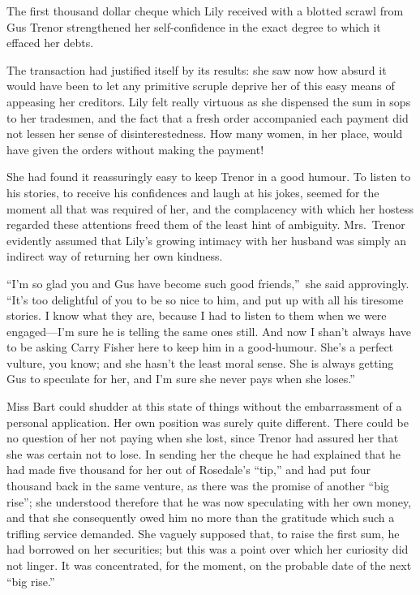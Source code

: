 \documentclass[12pt,a4paper]{book}
\begin{document}
The first thousand dollar cheque which Lily received with a
blotted scrawl from Gus Trenor strengthened her self-confidence
in the exact degree to which it effaced her debts.





The transaction had justified itself by its results: she saw now
how absurd it would have been to let any primitive scruple
deprive her of this easy means of appeasing her creditors. Lily
felt really virtuous as she dispensed the sum in sops to her
tradesmen, and the fact that a fresh order accompanied each
payment did not lessen her sense of disinterestedness. How many
women, in her place, would have given the orders without making
the payment!





She had found it reassuringly easy to keep Trenor in a good
humour. To listen to his stories, to receive his confidences and
laugh at his jokes, seemed for the moment all that was required
of her, and the complacency with which her hostess regarded these
attentions freed them of the least hint of ambiguity. Mrs.\ Trenor
evidently assumed that Lily's growing intimacy with her husband
was simply an indirect way of returning her own kindness.





``I'm so glad you and Gus have become such good friends,''\ she said
approvingly. ``It's too delightful of you to be so nice to him,
and put up with all his tiresome stories. I know what they are,
because I had to listen to them when we were engaged---I'm sure he
is telling the same ones still. And now I shan't always have to
be asking Carry Fisher here to keep him in a good-humour. She's a
perfect vulture, you know; and she hasn't the least moral sense. 
She is always getting Gus to speculate for her, and I'm sure she
never pays when she loses.''





Miss Bart could shudder at this state of things without the
embarrassment of a personal application. Her own position was
surely quite different. There could be no question of her not
paying when she lost, since Trenor had assured her that she was
certain not to lose. In sending her the cheque he had explained
that he had made five thousand for her out of Rosedale's ``tip,''
and had put four thousand back in the same venture, as
there was the promise of another ``big rise''; she understood
therefore that he was now speculating with her own money, and
that she consequently owed him no more than the gratitude which
such a trifling service demanded. She vaguely supposed that, to
raise the first sum, he had borrowed on her securities; but this
was a point over which her curiosity did not linger. It was
concentrated, for the moment, on the probable date of the next
``big rise.''
\end{document}
